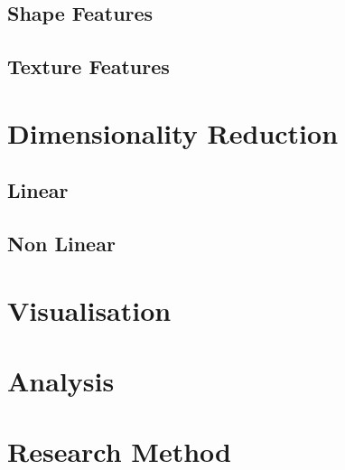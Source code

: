 \subsection{Shape Features}
\subsection{Texture Features}

\section{Dimensionality Reduction}
\subsection{Linear}
\subsection{Non Linear}

\section{Visualisation}

\section{Analysis}

\section{Research Method}
